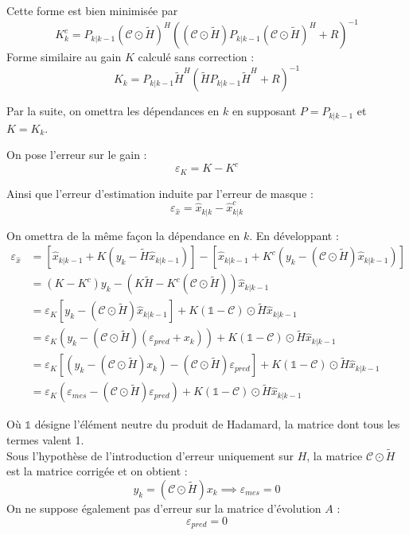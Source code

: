 \documentclass[titlepage]{article}
\newcommand{\C}{\mathcal{C}} %
\newcommand{\Ht}{\widetilde{H}} %
\newcommand{\Hc}{\C\odot\Ht} %
\begin{document}
	Cette forme est bien minimisée par 
	\begin{equation}
		K_k^c = P_{k|k-1}\left(\Hc\right)^H\left(\left(\Hc\right)P_{k|k-1}\left(\Hc\right)^H + R\right)^{-1}
	\end{equation}
	Forme similaire au gain $K$ calculé sans correction :
	\begin{equation}
		K_k = P_{k|k-1}\Ht^H\left(\Ht P_{k|k-1}\Ht^H + R\right)^{-1}
	\end{equation}

	Par la suite, on omettra les dépendances en $k$ en supposant $P=P_{k|k-1}$ et $K = K_k$.
	
	On pose l'erreur sur le gain :
	\begin{equation}
		\varepsilon_K = K - K^c 
	\end{equation}

	Ainsi que l'erreur d'estimation induite par l'erreur de masque :
	\begin{equation}
		\varepsilon_{\widehat{x}} = \widehat{x}_{k|k} - \widehat{x}_{k|k}^c
	\end{equation}
	
	On omettra de la même façon la dépendance en $k$. En développant :
	\begin{align*}
		\varepsilon_{\widehat{x}} &= \left[\widehat{x}_{k|k-1} + K(y_k-\Ht\widehat{x}_{k|k-1})\right] - \left[\widehat{x}_{k|k-1} + K^c\left(y_k - \left(\Hc\right)\widehat{x}_{k|k-1}\right)\right] \\
		&= \left(K-K^c\right)y_k - \left(K\Ht - K^c(\Hc)\right)\widehat{x}_{k|k-1} \\
		&= \varepsilon_K\left[y_k - \left(\Hc\right)\widehat{x}_{k|k-1}\right] + K\left(\mathbb{1}-\C\right)\odot\Ht\widehat{x}_{k|k-1} \\
		&= \varepsilon_K(y_k - (\Hc)\left(\varepsilon_{pred} + x_k\right)) + K\left(\mathbb{1}-\C\right)\odot\Ht\widehat{x}_{k|k-1} \\
		&= \varepsilon_K\left[\left(y_k - (\Hc)x_k\right) - (\Hc)\varepsilon_{pred}\right] + K\left(\mathbb{1}-\C\right)\odot\Ht\widehat{x}_{k|k-1} \\
		&= \varepsilon_K\left(\varepsilon_{mes} - (\Hc)\varepsilon_{pred}\right) + K\left(\mathbb{1}-\C\right)\odot\Ht\widehat{x}_{k|k-1}
	\end{align*}

	Où $\mathbb{1}$ désigne l'élément neutre du produit de Hadamard, la matrice dont tous les termes valent 1.\\	

	Sous l'hypothèse de l'introduction d'erreur uniquement sur $H$, la matrice $\C\odot\Ht$ est la matrice corrigée et on obtient :
	$$
		y_k = (\Hc) x_k \implies \varepsilon_{mes} = 0
	$$
	On ne suppose également pas d'erreur sur la matrice d'évolution $A$ :
	$$
		\varepsilon_{pred} = 0
	$$
	
\end{document}
